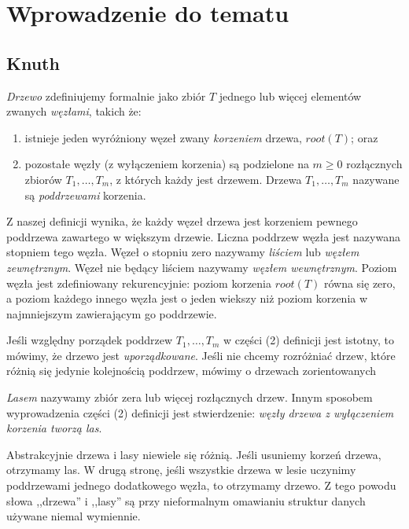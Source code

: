 \chapter{Wprowadzenie do tematu}


\section{Knuth}

\emph{Drzewo} zdefiniujemy formalnie jako zbiór $T$ jednego lub więcej elementów zwanych \emph{węzłami}, takich że:

\begin{enumerate}
 \item istnieje jeden wyróżniony węzeł zwany \emph{korzeniem} drzewa, $root(T)$; oraz
 \item pozostałe węzły (z wyłączeniem korzenia) są podzielone na $m \geq 0$ rozłącznych zbiorów $T_{1},\ldots, T_{m}$,
	z których każdy jest drzewem. Drzewa $T_{1},\ldots, T_{m}$ nazywane są \emph{poddrzewami} korzenia.
\end{enumerate}

Z naszej definicji wynika, że każdy węzeł drzewa jest korzeniem pewnego poddrzewa zawartego w większym drzewie.
Liczna poddrzew węzła jest nazywana stopniem tego węzła.
Węzeł o stopniu zero nazywamy \emph{liściem} lub \emph{węzłem zewnętrznym}. 
Węzeł nie będący liściem nazywamy \emph{węzłem wewnętrznym}. 
Poziom węzła jest zdefiniowany rekurencyjnie: poziom korzenia $root(T)$ równa się zero,
a poziom każdego innego węzła jest o jeden wiekszy niż poziom korzenia w najmniejszym 
 zawierającym go poddrzewie.

Jeśli względny porządek poddrzew $T_{1},\ldots, T_{m}$ w części (2) definicji jest istotny,
to mówimy, że drzewo jest \emph{uporządkowane}. 
Jeśli nie chcemy rozróżniać drzew, które różnią się jedynie kolejnością poddrzew, mówimy o drzewach zorientowanych

\emph{Lasem} nazywamy zbiór zera lub więcej rozłącznych drzew. 
Innym sposobem wyprowadzenia części (2) definicji jest stwierdzenie: \textit{węzły drzewa z wyłączeniem korzenia tworzą las}.

Abstrakcyjnie drzewa i lasy niewiele się różnią.
Jeśli usuniemy korzeń drzewa, otrzymamy las.
W drugą stronę, jeśli wszystkie drzewa w lesie uczynimy poddrzewami jednego dodatkowego węzła,
to otrzymamy drzewo.
Z tego powodu słowa ,,drzewa'' i ,,lasy'' są przy nieformalnym omawianiu struktur danych używane niemal wymiennie.

